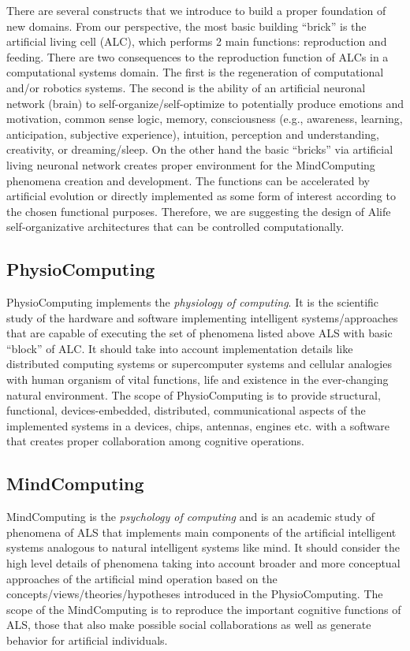 There are several constructs that we introduce to build a proper
foundation of new domains. From our perspective, the most basic building
``brick'' is the artificial living cell (ALC), which performs 2 main
functions: reproduction and feeding. There are two consequences to the
reproduction function of ALCs in a computational systems domain. The
first is the regeneration of computational and/or robotics systems. The
second is the ability of an artificial neuronal network (brain) to
self-organize/self-optimize to potentially produce emotions and
motivation, common sense logic, memory, consciousness (e.g., awareness,
learning, anticipation, subjective experience), intuition, perception
and understanding, creativity, or dreaming/sleep. On the other hand the
basic ``bricks'' via artificial living neuronal network creates proper
environment for the MindComputing phenomena creation and development.
The functions can be accelerated by artificial evolution or directly
implemented as some form of interest according to the chosen functional
purposes. Therefore, we are suggesting the design of Alife
self-organizative architectures that can be controlled computationally.

\subsection{PhysioComputing}\label{physiocomputing}

PhysioComputing implements the \emph{physiology of computing}. It is the
scientific study of the hardware and software implementing intelligent
systems/approaches that are capable of executing the set of phenomena
listed above ALS with basic ``block'' of ALC. It should take into
account implementation details like distributed computing systems or
supercomputer systems and cellular analogies with human organism of
vital functions, life and existence in the ever-changing natural
environment. The scope of PhysioComputing is to provide structural,
functional, devices-embedded, distributed, communicational aspects of
the implemented systems in a devices, chips, antennas, engines etc. with
a software that creates proper collaboration among cognitive operations.

\subsection{MindComputing}\label{mindcomputing}

MindComputing is the \emph{psychology of computing} and is an academic
study of phenomena of ALS that implements main components of the
artificial intelligent systems analogous to natural intelligent systems
like mind. It should consider the high level details of phenomena taking
into account broader and more conceptual approaches of the artificial
mind operation based on the concepts/views/theories/hypotheses
introduced in the PhysioComputing. The scope of the MindComputing is to
reproduce the important cognitive functions of ALS, those that also make
possible social collaborations as well as generate behavior for
artificial individuals.

